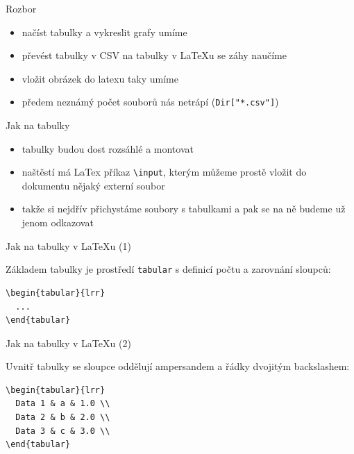 \documentclass{beamer}
\begin{document}
\begin{frame}{Rozbor}
  \begin{itemize}
    \item načíst tabulky a vykreslit grafy umíme
    \item převést tabulky v CSV na tabulky v LaTeXu se záhy naučíme
    \item vložit obrázek do latexu taky umíme
    \item předem neznámý počet souborů nás netrápí (\texttt{Dir["*.csv"]})
  \end{itemize}
\end{frame}

\begin{frame}[fragile]{Jak na tabulky}
  \begin{itemize}
    \item tabulky budou dost rozsáhlé a montovat
    \item naštěstí má LaTex příkaz \texttt{\textbackslash{}input}, kterým můžeme prostě vložit do dokumentu nějaký externí soubor
    \item takže si nejdřív přichystáme soubory s tabulkami a pak se na ně budeme už jenom odkazovat
  \end{itemize}
\end{frame}

\begin{frame}[fragile]{Jak na tabulky v LaTeXu (1)}
  \begin{block}{ }
    Základem tabulky je prostředí \texttt{tabular} s definicí počtu a zarovnání sloupců:
    \scriptsize
    \begin{verbatim}
\begin{tabular}{lrr}
  ...
\end{tabular}
    \end{verbatim}
  \end{block}
\end{frame}

\begin{frame}[fragile]{Jak na tabulky v LaTeXu (2)}
  \begin{block}{ }
    Uvnitř tabulky se sloupce oddělují ampersandem a řádky dvojitým backslashem:
    \scriptsize
    \begin{verbatim}
\begin{tabular}{lrr}
  Data 1 & a & 1.0 \\
  Data 2 & b & 2.0 \\
  Data 3 & c & 3.0 \\
\end{tabular}
    \end{verbatim}
  \end{block}
\end{frame}
\end{document}

